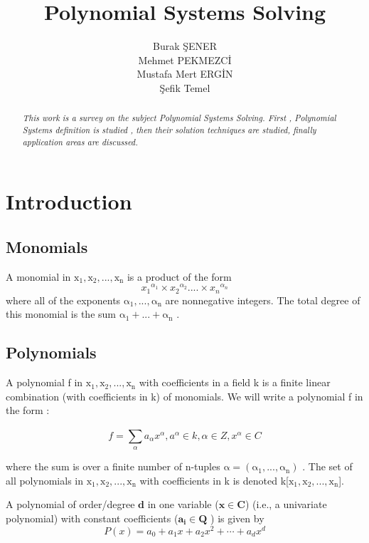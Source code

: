 \documentclass[11pt]{article}
\title{\textbf{Polynomial Systems Solving}}
\author{Burak ŞENER\\
        Mehmet PEKMEZCİ\\
		Mustafa Mert ERGİN\\
		Şefik Temel
		}
\date{}
\begin{document}
\maketitle
\begin{abstract}
\emph{This work is a survey on the subject Polynomial Systems Solving. First , Polynomial Systems definition is studied , then their solution techniques are studied, finally application areas are discussed. }
\end{abstract}

\section{Introduction}

\subsection{Monomials}
A monomial in $\mathrm{x_1, x_2, ...,x_n}$ is a product of the form
\begin{equation}
    {x_1}^{\alpha_1} \times {x_2}^{\alpha_2} .... \times {x_n}^{\alpha_n}
\end{equation}
where all of the exponents $\mathrm{\alpha_1,...,\alpha_n }$ are nonnegative integers. The total degree of this monomial is the sum $\mathrm{\alpha_1+...+\alpha_n }$ .

\subsection{Polynomials}
A polynomial f in $\mathrm{x_1, x_2, ...,x_n}$ with coefficients in a field k is a finite linear combination (with coefficients in k) of monomials. We will write a polynomial f in the form :\cite{coxLittleOshea}

\begin{equation}
   f =  \sum_{\alpha}^{}{a_{\alpha}{x}^{\alpha} }, a^{\alpha} \in k, \alpha \in Z, {x}^{\alpha} \in C 
\end{equation}


where the sum is over a finite number of n-tuples $\mathrm{\alpha=(\alpha_1,...,\alpha_n) }$ . The set of all polynomials in $\mathrm{x_1, x_2, ...,x_n}$ with coefficients in k is denoted k[$\mathrm{x_1, x_2, ...,x_n}$].

 A polynomial of order/degree $\mathbf{d}$  in one variable ($\mathbf{x \in C}$) (i.e., a univariate polynomial) with constant coefficients ($\mathbf{a_i \in Q}$ ) is given by \cite{wolframPolynomial}
\begin{equation}
    P(x)=a_{0}+a_{1}x+a_{2}{x}^2+\cdots+a_{d}{x}^d
\end{equation}
\end{document}

